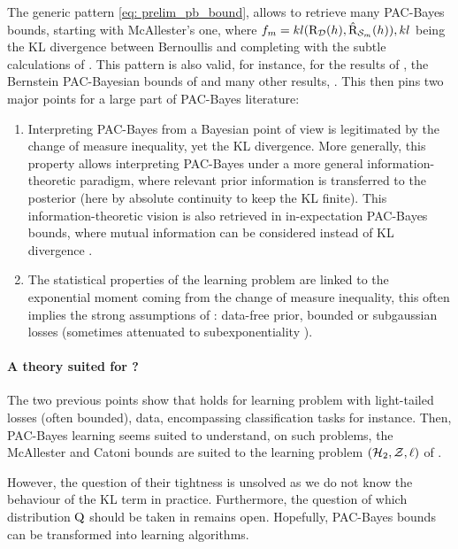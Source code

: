 The generic pattern \eqref{eq: prelim_pb_bound}, allows to retrieve many PAC-Bayes bounds, starting with McAllester's one, where $f_m= kl(\text{R}_{\mathcal{D}}(h),\hat{\text{R}}_{\mathcal{S}_m}(h)), kl$ being the KL divergence between Bernoullis and completing with the subtle calculations of \citet{maurer2004note}. This pattern is also valid, for instance, for the results of \citet{germain2009pac}, the Bernstein PAC-Bayesian bounds of \citet{tolstikhin2013pac,mhammedi2019pac} and many other results, \eg \citet{thiemann2017strongly,guedj2018pac,holland2019pac,wu2022split}. This then pins two major points for a large part of PAC-Bayes literature: 

\begin{enumerate}
  \item Interpreting PAC-Bayes from a Bayesian point of view is legitimated by the change of measure inequality, yet the KL divergence. More generally, this property allows interpreting PAC-Bayes under a more general information-theoretic paradigm, where relevant prior information is transferred to the posterior (here by absolute continuity to keep the KL finite). This information-theoretic vision is also retrieved in in-expectation PAC-Bayes bounds, where mutual information can be considered instead of KL divergence \citep{russo2016control,xu2017info,steinke2020reason,grunwald2021mac,hellstrom2020gene,hellstrom2022new}. 
  \item The statistical properties of the learning problem are linked to the exponential moment coming from the change of measure inequality, this often implies the strong assumptions of : data-free prior, bounded or subgaussian losses (sometimes attenuated to subexponentiality \citealp{catoni2004statistical}).
\end{enumerate}

\paragraph{A theory suited for ?}
The two previous points show that  holds for learning problem with light-tailed losses (often bounded), \iid data, encompassing classification tasks for instance. Then, PAC-Bayes learning seems suited to understand, on such problems, the McAllester and Catoni bounds are suited to the learning problem $(\mathcal{H}_2,\mathcal{Z},\ell)$ of . 

However, the question of their tightness is unsolved as we do not know the behaviour of the KL term in practice. Furthermore, the question of which distribution $\mathrm{Q}$ should be taken in  remains open. Hopefully, PAC-Bayes bounds can be transformed into learning algorithms.

